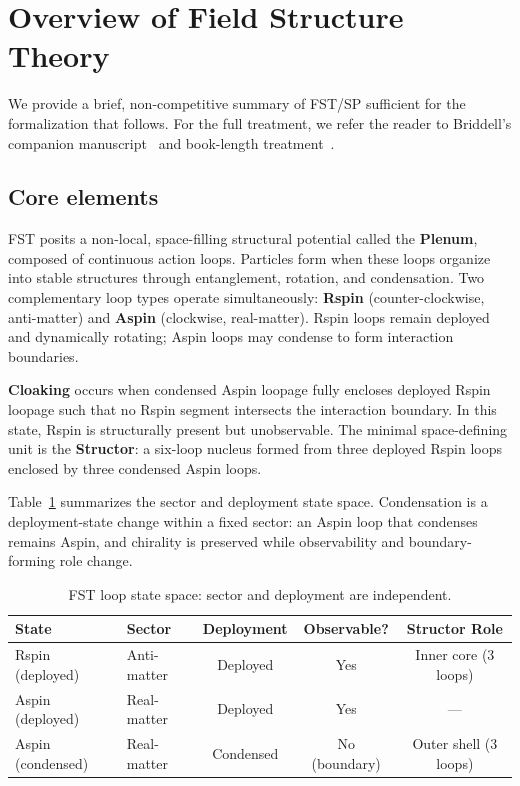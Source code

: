 \documentclass[12pt,a4paper]{article}
\begin{document}

\section{Overview of Field Structure Theory}

We provide a brief, non-competitive summary of FST/SP sufficient for the
formalization that follows. For the full treatment, we refer the reader to
Briddell's companion manuscript~\cite{briddell2026} and book-length
treatment~\cite{briddellbook2020}.

\subsection{Core elements}

FST posits a non-local, space-filling structural potential called the
\textbf{Plenum}, composed of continuous action loops. Particles form when
these loops organize into stable structures through entanglement, rotation,
and condensation. Two complementary loop types operate simultaneously:
\textbf{Rspin} (counter-clockwise, anti-matter) and \textbf{Aspin}
(clockwise, real-matter). Rspin loops remain deployed and dynamically
rotating; Aspin loops may condense to form interaction boundaries.

\textbf{Cloaking} occurs when condensed Aspin loopage fully encloses
deployed Rspin loopage such that no Rspin segment intersects the
interaction boundary. In this state, Rspin is structurally present but
unobservable. The minimal space-defining unit is the \textbf{Structor}:
a six-loop nucleus formed from three deployed Rspin loops enclosed by
three condensed Aspin loops.

Table~\ref{tab:states} summarizes the sector and deployment state space.
Condensation is a deployment-state change within a fixed sector: an Aspin
loop that condenses remains Aspin, and chirality is preserved while
observability and boundary-forming role change.

\begin{table}[h]
\centering
\caption{FST loop state space: sector and deployment are independent.}
\label{tab:states}
\begin{tabular}{@{}llccc@{}}
\toprule
\textbf{State} & \textbf{Sector} & \textbf{Deployment} & \textbf{Observable?} & \textbf{Structor Role} \\
\midrule
Rspin (deployed) & Anti-matter & Deployed & Yes & Inner core (3 loops) \\
Aspin (deployed) & Real-matter & Deployed & Yes & --- \\
Aspin (condensed) & Real-matter & Condensed & No (boundary) & Outer shell (3 loops) \\
\bottomrule
\end{tabular}
\end{table}
\end{document}
